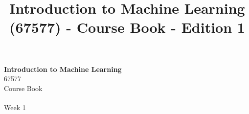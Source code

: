 \documentclass[11pt]{book} %
\begin{document}
\title{Introduction to Machine Learning (67577) - Course Book - Edition 1}


\begingroup
\thispagestyle{empty}
\centering
\vspace*{5cm}
\par\normalfont\fontsize{35}{35}\sffamily\selectfont
\textbf{Introduction to Machine Learning}\\
{\LARGE 67577\\Course Book\\ ~\\Week 1}\par %
\vspace*{1cm}
\endgroup
\end{document}
